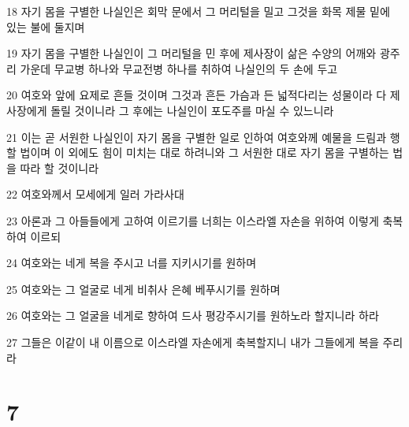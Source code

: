 \par 18 자기 몸을 구별한 나실인은 회막 문에서 그 머리털을 밀고 그것을 화목 제물 밑에 있는 불에 둘지며
\par 19 자기 몸을 구별한 나실인이 그 머리털을 민 후에 제사장이 삶은 수양의 어깨와 광주리 가운데 무교병 하나와 무교전병 하나를 취하여 나실인의 두 손에 두고
\par 20 여호와 앞에 요제로 흔들 것이며 그것과 흔든 가슴과 든 넓적다리는 성물이라 다 제사장에게 돌릴 것이니라 그 후에는 나실인이 포도주를 마실 수 있느니라
\par 21 이는 곧 서원한 나실인이 자기 몸을 구별한 일로 인하여 여호와께 예물을 드림과 행할 법이며 이 외에도 힘이 미치는 대로 하려니와 그 서원한 대로 자기 몸을 구별하는 법을 따라 할 것이니라
\par 22 여호와께서 모세에게 일러 가라사대
\par 23 아론과 그 아들들에게 고하여 이르기를 너희는 이스라엘 자손을 위하여 이렇게 축복하여 이르되
\par 24 여호와는 네게 복을 주시고 너를 지키시기를 원하며
\par 25 여호와는 그 얼굴로 네게 비취사 은혜 베푸시기를 원하며
\par 26 여호와는 그 얼굴을 네게로 향하여 드사 평강주시기를 원하노라 할지니라 하라
\par 27 그들은 이같이 내 이름으로 이스라엘 자손에게 축복할지니 내가 그들에게 복을 주리라

\chapter{7}

